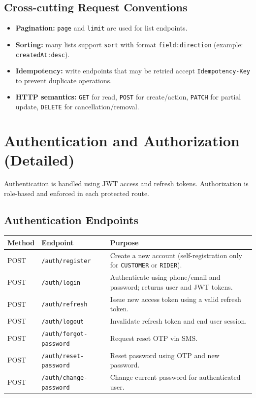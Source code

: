 \subsection{Cross-cutting Request Conventions}

\begin{itemize}
		\item \textbf{Pagination:} \texttt{page} and \texttt{limit} are used for list endpoints.
		\item \textbf{Sorting:} many lists support \texttt{sort} with format
					\texttt{field:direction} (example: \texttt{createdAt:desc}).
		\item \textbf{Idempotency:} write endpoints that may be retried accept
					\texttt{Idempotency-Key} to prevent duplicate operations.
		\item \textbf{HTTP semantics:}
					\texttt{GET} for read, \texttt{POST} for create/action,
					\texttt{PATCH} for partial update, \texttt{DELETE} for cancellation/removal.
\end{itemize}

\section{Authentication and Authorization (Detailed)}

Authentication is handled using JWT access and refresh tokens.
Authorization is role-based and enforced in each protected route.

\subsection{Authentication Endpoints}

\begin{tabularx}{\textwidth}{@{}p{2.5cm}p{4.4cm}X@{}}
\toprule
\textbf{Method} & \textbf{Endpoint} & \textbf{Purpose} \\
\midrule
POST & \texttt{/auth/register} & Create a new account (self-registration only for \texttt{CUSTOMER} or \texttt{RIDER}). \\
POST & \texttt{/auth/login} & Authenticate using phone/email and password; returns user and JWT tokens. \\
POST & \texttt{/auth/refresh} & Issue new access token using a valid refresh token. \\
POST & \texttt{/auth/logout} & Invalidate refresh token and end user session. \\
POST & \texttt{/auth/forgot-password} & Request reset OTP via SMS. \\
POST & \texttt{/auth/reset-password} & Reset password using OTP and new password. \\
POST & \texttt{/auth/change-password} & Change current password for authenticated user. \\
\bottomrule
\end{tabularx}

